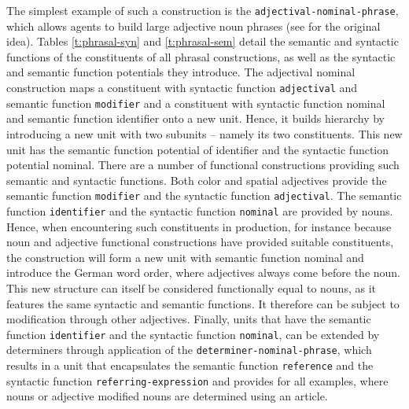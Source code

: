 The simplest example of such a construction is the {\footnotesize\tt adjectival-nominal-phrase}, which allows agents to build large adjective noun phrases 
(see \citealt{steels2011phrasal} for the original idea). 
Tables \ref{t:phrasal-syn} 
and \ref{t:phrasal-sem} detail the semantic and syntactic functions of 
the constituents of all phrasal constructions, as well as the syntactic 
and semantic function potentials they introduce. The adjectival 
nominal construction maps a constituent with syntactic 
function {\footnotesize\tt adjectival} and semantic function {\footnotesize\tt modifier} and a constituent with syntactic function nominal and semantic function identifier onto a new unit. Hence, it builds hierarchy by introducing a new unit with two subunits -- 
namely its two constituents. This new unit has the semantic function potential of identifier and the syntactic function 
potential nominal. There are a number of functional constructions providing such semantic and syntactic 
functions. Both color and spatial adjectives provide the semantic function {\footnotesize\tt modifier} and the syntactic
function {\footnotesize\tt adjectival}. The semantic function {\footnotesize\tt identifier} and the syntactic function {\footnotesize\tt nominal} are provided by nouns. Hence, when encountering such constituents in production, for instance because noun and adjective functional constructions have provided suitable constituents, the construction will form a new unit with semantic function 
nominal and introduce the German word order, where adjectives always come before the 
noun. This new structure can itself be considered functionally equal to nouns, as it features the same syntactic and 
semantic functions. It therefore can be subject to modification through other adjectives. Finally, units that have the
semantic function {\footnotesize\tt identifier} and the syntactic function {\footnotesize\tt nominal},
can be extended by determiners through application of the {\footnotesize\tt determiner-nominal-phrase}, which results in a unit that encapsulates the semantic function 
{\footnotesize\tt reference} and the syntactic function {\footnotesize\tt referring-expression} and
provides for all examples, where nouns or adjective modified nouns are determined
using an article.
